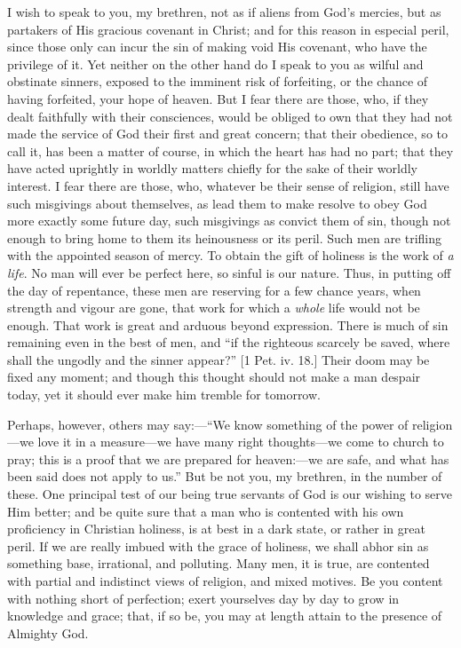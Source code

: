 I wish to speak to you, my brethren, not as if aliens
from God's mercies, but as partakers of His gracious
covenant in Christ; and for this reason in especial
peril, since those only can incur the sin of making void
His covenant, who have the privilege of it. Yet neither
on the other hand do I speak to you as wilful and
obstinate sinners, exposed to the imminent risk of
forfeiting, or the chance of having forfeited, your hope
of heaven. But I fear there are those, who, if they dealt
faithfully with their consciences, would be obliged to
own that they had not made the service of God their first
and great concern; that their obedience, so to call it,
has been a matter of course, in which the heart has had
no part; that they have acted uprightly in worldly
matters chiefly for the sake of their worldly interest. I
fear there are those, who, whatever be their sense of
religion, still have such misgivings about themselves, as
lead them to make resolve to obey God more exactly some
future day, such misgivings as convict them of sin,
though not enough to bring home to them its heinousness
or its peril. Such men are trifling with the appointed
season of mercy. To obtain the gift of holiness is the
work of \emph{a life}. No man will ever be perfect
here, so sinful is our nature. Thus, in putting off the
day of repentance, these men are reserving for a few
chance years, when strength and vigour are gone, that
work for which a \emph{whole} life would not be enough. That
work is great and arduous beyond expression. There is
much of sin remaining even in the best of men, and
``if the righteous scarcely be saved, where shall the
ungodly and the sinner appear?'' [1 Pet. iv. 18.] Their
doom may be fixed any moment; and though this thought
should not make a man despair today, yet it should ever
make him tremble for tomorrow.

Perhaps, however, others may say:—``We know
something of the power of religion—we love it in a
measure—we have many right thoughts—we come to
church to pray; this is a proof that we are prepared for
heaven:—we are safe, and what has been said does not
apply to us.'' But be not you, my brethren, in the
number of these. One principal test of our being true
servants of God is our wishing to serve Him better; and
be quite sure that a man who is contented with his own
proficiency in Christian holiness, is at best in a dark
state, or rather in great peril. If we are really imbued
with the grace of holiness, we shall abhor sin as
something base, irrational, and polluting. Many men, it
is true, are contented with partial and indistinct views
of religion, and mixed motives. Be you content with
nothing short of perfection; exert yourselves day by day
to grow in knowledge and grace; that, if so be, you may
at length attain to the presence of Almighty God.

